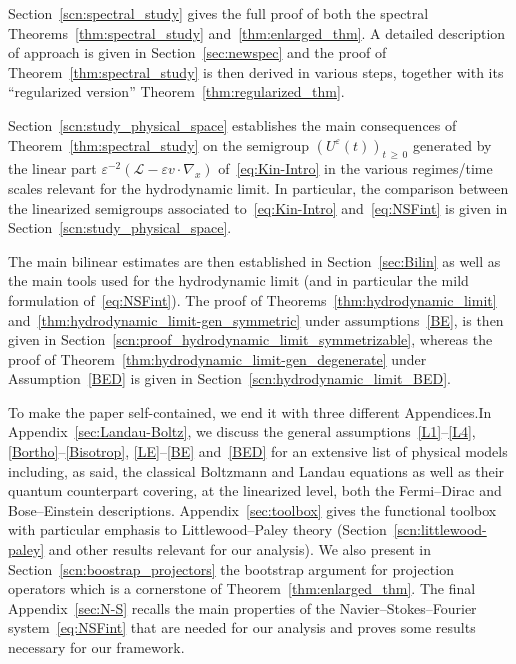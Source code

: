 \documentclass[10pt]{amsart}
\theoremstyle{definition}\newtheorem{defi}[theo]{Definition}\newtheorem{rema}[theo]{Remark}\newtheorem{exam}[theo]{Example}\newtheorem{exem}[theo]{Example}\newtheorem{nota}[theo]{Notation}
\newcommand{\LL}{\mathcal{L}}
\renewcommand*\geq{\geqslant}
\newcommand*\eps{{\varepsilon}}
\begin{document}
Section~\ref{scn:spectral_study} gives the full proof of both the spectral Theorems~\ref{thm:spectral_study} and~\ref{thm:enlarged_thm}. A detailed description of approach is given in Section~\ref{sec:newspec} and the proof of Theorem~\ref{thm:spectral_study} is then derived in various steps, together with its ``regularized version'' Theorem~\ref{thm:regularized_thm}.

Section~\ref{scn:study_physical_space} establishes the main consequences of Theorem~\ref{thm:spectral_study} on the semigroup $(U^\eps(t))_{t\,\geq\,0}$ generated by the linear part $\eps^{-2} (\LL - \eps v \cdot \nabla_x)$ of~\eqref{eq:Kin-Intro} in the various regimes/time scales relevant for the hydrodynamic limit. In particular, the comparison between the linearized semigroups associated to~\eqref{eq:Kin-Intro} and~\eqref{eq:NSFint} is given in Section~\ref{scn:study_physical_space}.

The main bilinear estimates are then established in Section~\ref{sec:Bilin} as well as the main tools used for the hydrodynamic limit (and in particular the mild formulation of~\eqref{eq:NSFint}). The proof of Theorems~\ref{thm:hydrodynamic_limit} and~\ref{thm:hydrodynamic_limit-gen_symmetric} under assumptions~\ref{BE}, is then given in Section~\ref{scn:proof_hydrodynamic_limit_symmetrizable}, whereas the proof of Theorem~\ref{thm:hydrodynamic_limit-gen_degenerate} under Assumption~\eqref{BED} is given in Section~\ref{scn:hydrodynamic_limit_BED}.

To make the paper self-contained, we end it with three different Appendices.In Appendix~\ref{sec:Landau-Boltz}, we discuss the general assumptions~\eqref{L1}--\eqref{L4}, \eqref{Bortho}--\eqref{Bisotrop}, \eqref{LE}--\eqref{BE} and~\eqref{BED} for an extensive list of physical models including, as said, the classical Boltzmann and Landau equations as well as their quantum counterpart covering, at the linearized level, both the Fermi--Dirac and Bose--Einstein descriptions. Appendix~\ref{sec:toolbox} gives the functional toolbox with particular emphasis to Littlewood--Paley theory (Section~\ref{scn:littlewood-paley} and other results relevant for our analysis). We also present in Section~\ref{scn:boostrap_projectors} the bootstrap argument for projection operators which is a cornerstone of Theorem~\ref{thm:enlarged_thm}. The final Appendix~\ref{sec:N-S} recalls the main properties of the Navier--Stokes--Fourier system~\eqref{eq:NSFint} that are needed for our analysis {and proves some results necessary for our framework}.
\end{document}

